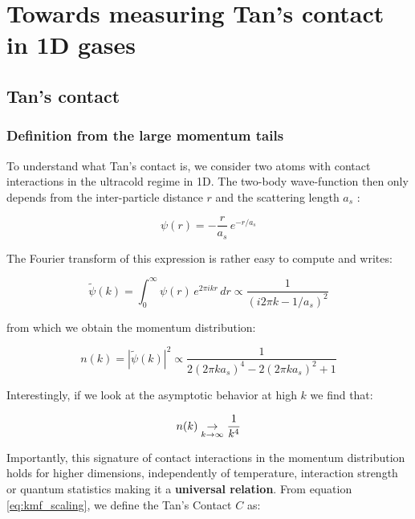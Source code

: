 \chapter{Towards measuring Tan's contact in 1D gases}

\section{Tan's contact}

\subsection{Definition from the large momentum tails}

To understand what Tan's contact is, we consider two atoms with contact interactions in the ultracold regime in 1D. The two-body wave-function then only depends from the inter-particle distance $r$ and the scattering length $a_s$ \cite{viverit2004momentum}:

\begin{equation}
    \psi(r) = - \frac{r}{a_s} \, e^{-r/a_s}
\end{equation}

\noindent The Fourier transform of this expression is rather easy to compute and writes:

\begin{equation}
    \tilde{\psi}(k) = \int_0^\infty \psi(r) \, e^{2 \pi i k r} \, dr \propto \frac{1}{(i 2 \pi k - 1/a_s)^2}
\end{equation}

\noindent from which we obtain the momentum distribution:

\begin{equation}
     n(k) = |\tilde{\psi}(k) |^2 \propto \frac{1}{2(2 \pi k a_s)^4 - 2(2 \pi k a_s)^2 +1}
\end{equation}

\noindent Interestingly, if we look at the asymptotic behavior at high $k$ we find that:

\begin{equation}
    n(k) \underrel{k \to \infty} \to \frac{1}{k^4}
    \label{eq:kmf_scaling}
\end{equation}

\noindent Importantly, this signature of contact interactions in the momentum distribution holds for higher dimensions, independently of temperature, interaction strength or quantum statistics making it a \textbf{universal relation}. From equation \ref{eq:kmf_scaling}, we define the Tan's Contact $C$ as:

